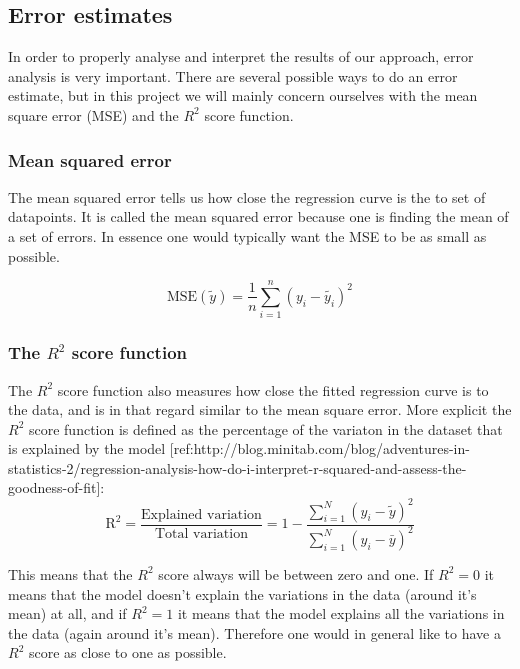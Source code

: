 \documentclass{emulateapj}
\begin{document}
\subsection{Error estimates}
In order to properly analyse and interpret the results of our approach, error analysis is very important. There are several possible ways to do an error estimate, but in this project we will mainly concern ourselves with the mean square error (MSE) and the $R^2$ score function.\newline

\subsubsection{Mean squared error}
The mean squared error tells us how close the regression curve is the to set of datapoints. It is called the mean squared error because one is finding the mean of a set of errors. In essence one would typically want the MSE to be as small as possible.

\begin{equation}
\text{MSE}(\tilde{y})=\frac{1}{n}\sum_{i=1}^n(y_i-\tilde{y_i})^2
\end{equation}

\subsubsection{The $R^2$ score function}
The $R^2$ score function also measures how close the fitted regression curve is to the data, and is in that regard similar to the mean square error. More explicit the $R^2$ score function is defined as the percentage of the variaton in the dataset that is explained by the model [ref:http://blog.minitab.com/blog/adventures-in-statistics-2/regression-analysis-how-do-i-interpret-r-squared-and-assess-the-goodness-of-fit]:
\begin{equation}
\text{R}^2=\frac{\text{Explained variation}}{\text{Total variation}} = 1-\frac{\sum_{i=1}^N(y_i-\tilde{y})^2}{\sum_{i=1}^N(y_i-\bar{y})^2}
\end{equation}

This means that the $R^2$ score always will be between zero and one. If $R^2 = 0$ it means that the model doesn't explain the variations in the data (around it's mean) at all, and if $R^2 = 1$ it means that the model explains all the variations in the data (again around it's mean). Therefore one would in general like to have a $R^2$ score as close to one as possible.\newline
\end{document}

